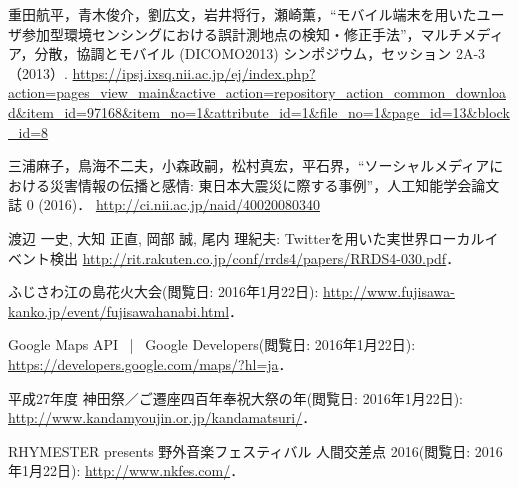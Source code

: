 \newpage

\renewcommand{\bibname}{References}

\begin{thebibliography}{2}

        重田航平，青木俊介，劉広文，岩井将行，瀬崎薫，“モバイル端末を用いたユーザ参加型環境センシングにおける誤計測地点の検知・修正手法”，マルチメディア，分散，協調とモバイル (DICOMO2013) シンポジウム，セッション 2A-3（2013）.
         \url{https://ipsj.ixsq.nii.ac.jp/ej/index.php?action=pages_view_main&active_action=repository_action_common_download&item_id=97168&item_no=1&attribute_id=1&file_no=1&page_id=13&block_id=8}

         三浦麻子，鳥海不二夫，小森政嗣，松村真宏，平石界，“ソーシャルメディアにおける災害情報の伝播と感情: 東日本大震災に際する事例”，人工知能学会論文誌 0 (2016)．
         \url{http://ci.nii.ac.jp/naid/40020080340}

        渡辺 一史, 大知 正直, 岡部 誠, 尾内 理紀夫:
        Twitterを用いた実世界ローカルイベント検出
        \url{http://rit.rakuten.co.jp/conf/rrds4/papers/RRDS4-030.pdf}．

        ふじさわ江の島花火大会(閲覧日: 2016年1月22日):
        \url{http://www.fujisawa-kanko.jp/event/fujisawahanabi.html}．

        Google Maps API  |  Google Developers(閲覧日: 2016年1月22日):
        \url{https://developers.google.com/maps/?hl=ja}．

        平成27年度 神田祭／ご遷座四百年奉祝大祭の年(閲覧日: 2016年1月22日):
        \url{http://www.kandamyoujin.or.jp/kandamatsuri/}．

        RHYMESTER presents 野外音楽フェスティバル 人間交差点 2016(閲覧日: 2016年1月22日):
        \url{http://www.nkfes.com/}．


\end{thebibliography}
